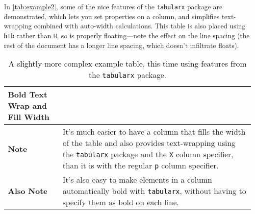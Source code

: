 In \autoref{tab:example2}, some of the nice features of the \texttt{tabularx} package are demonstrated, which lets you set properties on a column, and simplifies text-wrapping combined with auto-width calculations. This table is also placed using \texttt{htb} rather than \texttt{H}, so is properly floating---note the effect on the line spacing (the rest of the document has a longer line spacing, which doesn't infiltrate floats).

\begin{table}[htb]
    \caption[A More Complex Table Example]{A slightly more complex example table, this time using
        features from the \texttt{tabularx} package.}
    \label{tab:example2}
    \begin{center}
        \begin{tabularx}{\textwidth}{>{\bfseries}l X}
            \toprule
            \textbf{Bold} \textbf{Text Wrap and Fill Width} \\
            \midrule
            Note & It's much easier to have a column that fills the width of the table and also
            provides text-wrapping using the \texttt{tabularx} package and the \texttt{X} column
            specifier, than it is with the regular \texttt{p} column specifier. \\
            \midrule
            Also Note & It's also easy to make elements in a column automatically bold with
            \texttt{tabularx}, without having to specify them as bold on each line. \\
            \bottomrule
        \end{tabularx}
    \end{center}
\end{table}


